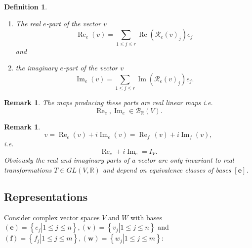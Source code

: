 \documentclass[aps,preprint]{revtex4}%
\newtheorem{definition}[theorem]{Definition}
\newtheorem{remark}[theorem]{Remark}
\begin{document}
\begin{definition}
\begin{enumerate}
\item The real $e$-part of the vector $v$%
\begin{equation}
\operatorname{Re}_{e}\left(  v\right)  =\sum_{1\leq j\leq r}\operatorname{Re}%
\left(  \mathcal{R}_{e}\left(  v\right)  _{j}\right)  e_{j}%
\end{equation}
and

\item the imaginary $e$-part of the vector $v$
\begin{equation}
\operatorname{Im}_{e}\left(  v\right)  =\sum_{1\leq j\leq r}\operatorname{Im}%
\left(  \mathcal{R}_{e}\left(  v\right)  _{j}\right)  e_{j}.
\end{equation}

\end{enumerate}
\end{definition}

\begin{remark}
The maps producing these parts are real linear maps i.e.
\begin{equation}
\operatorname{Re}_{e},\operatorname{Im}_{e}\in\mathcal{B}_{\mathbb{R}}\left(
V\right)  .
\end{equation}

\end{remark}

\begin{remark}%
\begin{equation}
v=\operatorname{Re}_{e}\left(  v\right)  +i\operatorname{Im}_{e}\left(
v\right)  =\operatorname{Re}_{f\ }\left(  v\right)  +i\operatorname{Im}%
_{f}\left(  v\right)  ,
\end{equation}
i.e.
\begin{equation}
\operatorname{Re}_{e}+i\operatorname{Im}_{e}=I_{V}.
\end{equation}
Obviously the real and imaginary parts of a vector are only invariant to real
transformations $T\in GL\left(  V,\mathbb{R}\right)  $ and depend on
equivalence classes of bases $\left[  \boldsymbol{e}\right]  $.
\end{remark}

\subsection{Representations}

Consider complex vector spaces $V$ and $W$ with bases $\left(  \boldsymbol{e}%
\right)  =\left\{  \left.  e_{j}\right\vert 1\leq j\leq n\right\}  ,\left(
\boldsymbol{v}\right)  =\left\{  \left.  v_{j}\right\vert 1\leq j\leq
n\right\}  $ and $\left(  \boldsymbol{f}\right)  =\left\{  \left.
f_{j}\right\vert 1\leq j\leq m\right\}  ,\left(  \boldsymbol{w}\right)
=\left\{  \left.  w_{j}\right\vert 1\leq j\leq m\right\}  :$
\end{document}

